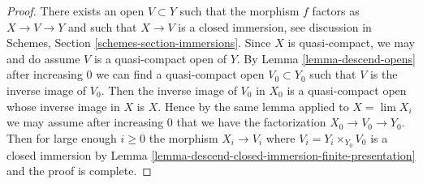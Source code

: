 \documentclass[10pt,a4paper]{amsart}
\theoremstyle{plain}
\theoremstyle{definition}
\theoremstyle{remark}
\numberwithin{equation}{subsection}
\def\lim{\mathop{\mathrm{lim}}\nolimits}
\begin{document}
\begin{proof}
There exists an open $V \subset Y$ such that the morphism
$f$ factors as $X \to V \to Y$ and such that $X \to V$ is
a closed immersion, see discussion in
Schemes, Section \ref{schemes-section-immersions}.
Since $X$ is quasi-compact, we may and do assume $V$ is a quasi-compact open
of $Y$. By Lemma \ref{lemma-descend-opens} after increasing $0$
we can find a quasi-compact open $V_0 \subset Y_0$ such that
$V$ is the inverse image of $V_0$. Then the inverse image of
$V_0$ in $X_0$ is a quasi-compact open whose inverse image in $X$ is $X$.
Hence by the same lemma applied to $X = \lim X_i$ we may
assume after increasing $0$ that we have the factorization
$X_0 \to V_0 \to Y_0$. Then for large enough $i \geq 0$ the morphism
$X_i \to V_i$ where $V_i = Y_i \times_{Y_0} V_0$ is a closed immersion by
Lemma \ref{lemma-descend-closed-immersion-finite-presentation}
and the proof is complete.
\end{proof}
\end{document}
